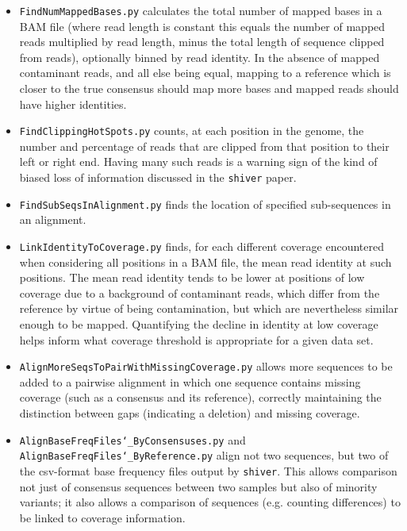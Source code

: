 \documentclass{article}
\newcommand{\shiv}{\c{shiver}\xspace}
\let\c\texttt
\begin{document}
\begin{itemize}
\item \c{FindNumMappedBases.py} calculates the total number of mapped bases in a BAM file (where read length is constant this equals the number of mapped reads multiplied by read length, minus the total length of sequence clipped from reads), optionally binned by read identity.
In the absence of mapped contaminant reads, and all else being equal, mapping to a reference which is closer to the true consensus should map more bases and mapped reads should have higher identities.

\item \c{FindClippingHotSpots.py} counts, at each position in the genome, the number and percentage of reads that are clipped from that position to their left or right end.
Having many such reads is a warning sign of the kind of biased loss of information discussed in the \shiv paper.

\item \c{FindSubSeqsInAlignment.py} finds the location of specified sub-sequences in an alignment.

\item \c{LinkIdentityToCoverage.py} finds, for each different coverage encountered when considering all positions in a BAM file, the mean read identity at such positions.
The mean read identity tends to be lower at positions of low coverage due to a background of contaminant reads, which differ from the reference by virtue of being contamination, but which are nevertheless similar enough to be mapped.
Quantifying the decline in identity at low coverage helps inform what coverage threshold is appropriate for a given data set.

\item \c{AlignMoreSeqsToPairWithMissingCoverage.py} allows more sequences to be added to a pairwise alignment in which one sequence contains missing coverage (such as a consensus and its reference), correctly maintaining the distinction between gaps (indicating a deletion) and missing coverage.

\item \c{AlignBaseFreqFiles\char`_ByConsensuses.py} and \c{AlignBaseFreqFiles\char`_ByReference.py} align not two sequences, but two of the csv-format base frequency files output by \shiv.
This allows comparison not just of consensus sequences between two samples but also of minority variants; it also allows a comparison of sequences (e.g. counting differences) to be linked to coverage information.


\end{itemize}
\end{document}
